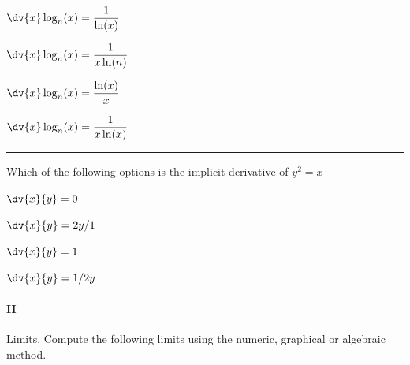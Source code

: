 \begin{preguntas}
\begin{enumerate*}[label=(\alph*)]
    \item \(\dv{x}\log_n(x) = \dfrac{1}{\ln(x)}\)\hspace{2em} 
    \item \(\dv{x}\log_n(x) = \dfrac{1}{x\ln(n)}\)\hspace{2em}
    \item \(\dv{x}\log_n(x) = \dfrac{\ln(x)}{x}\)\hspace{2em}
    \item \(\dv{x}\log_n(x) = \dfrac{1}{x\ln(x)}\)
\end{enumerate*}

\pregunta[4] \rule{1cm}{0.1mm} Which of the following options is the implicit derivative of \(y^2 = x\) 

\begin{enumerate*}[label=(\alph*)]
    \item \(\dv{x}{y}=0\)\hspace{2em} 
    \item \(\dv{x}{y}=2y/1\)\hspace{2em}
    \item \(\dv{x}{y}=1\)\hspace{2em}
    \item \(\dv{x}{y}=1/2y\)
\end{enumerate*}

\end{preguntas}

\newpage

\paragraph{II} Limits.
Compute the following limits using the numeric, graphical or algebraic method.

